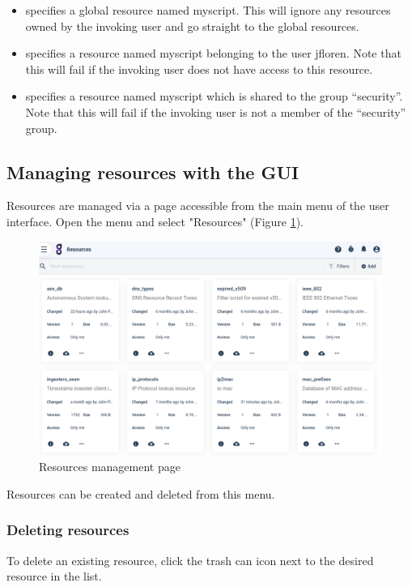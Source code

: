 \begin{itemize}
\item
   specifies a global resource named myscript.
  This will ignore any resources owned by the invoking user and go
  straight to the global resources.
\item
   specifies a resource named
  myscript belonging to the user jfloren. Note that this will
  fail if the invoking user does not have access to this resource.
\item
   specifies a resource named
  myscript which is shared to the group ``security''. Note that this
  will fail if the invoking user is not a member of the
  ``security'' group.
\end{itemize}

\subsection{Managing resources with the GUI}

Resources are managed via a page accessible from the main menu of the user interface. Open the
menu and select "Resources" (Figure \ref{fig:resource-page}).

\begin{figure}
	\includegraphics[width=0.7\linewidth]{images/resource-page.png}
	\caption{Resources management page}
	\label{fig:resource-page}
\end{figure}

Resources can be created and deleted from this menu.

\subsubsection{Deleting resources}

To delete an existing resource, click the trash can icon next to the
desired resource in the list. 

